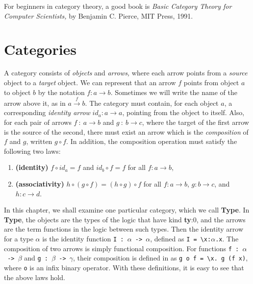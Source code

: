 For beginners in category theory, a good book is
{\it Basic Category Theory for Computer Scientists,} by Benjamin C. Pierce,
MIT Press, 1991.

\section{Categories}

A category consists of {\it objects\/} and {\it arrows,} where each arrow
points from a {\it source\/} object to a {\it target\/} object.
We can represent that an arrow $f$ points from object $a$ to object $b$ by
the notation $f : a \rightarrow b$.
Sometimes we will write the name of the arrow above it, as in
$a \stackrel{f}{\rightarrow} b$.
The category must contain, for each object $a$, a corresponding
{\it identity arrow\/} $id_a : a \rightarrow a$, pointing from the object
to itself.
Also, for each pair of arrows $f~:~a \rightarrow b$ and $g~:~b \rightarrow c$,
where the target of the first arrow is the source of the second,
there must exist an arrow which is the {\it composition\/} of $f$ and $g$,
written $g \circ f$.
In addition, the composition operation must satisfy the following two laws:
\begin{enumerate}
\item
{\bf (identity)}
$f \circ id_a = f$ and $id_b \circ f = f$ for all $f : a \rightarrow b$,
\item
{\bf (associativity)}
$h \circ (g \circ f) = (h \circ g) \circ f$ for all
   $f : a \rightarrow b$, $g : b \rightarrow c$, and $h : c \rightarrow d$.
\end{enumerate}

In this chapter, we shall examine one particular category, which we call {\bf Type}.
In {\bf Type}, the objects are the types of the \HOLW{} logic that have
kind {\bf ty}{:}0, and the arrows are the term functions in the logic
between such types.
Then the identity arrow for a type $\alpha$ is the identity function
\texttt{I~:~$\alpha$~->~$\alpha$}, defined as
\texttt{I~=}~\verb|\|\texttt{x:$\alpha$.x}.
The composition of two arrows is simply functional composition.
For functions \texttt{f~:~$\alpha$~->~$\beta$} and
\texttt{g~:~$\beta$~->~$\gamma$}, their composition is
defined in \HOLW{} as \texttt{g~o~f~=~}\verb|\|\texttt{x.~g~(f~x)},
where \texttt{o} is an infix binary operator.
With these definitions, it is easy to see that the above laws hold.

